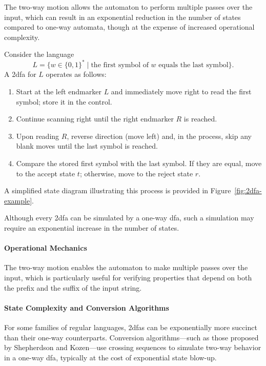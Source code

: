 \begin{remark}
The two-way motion allows the automaton to perform multiple passes over the input, which can result in an exponential reduction in the number of states compared to one-way automata, though at the expense of increased operational complexity.
\end{remark}

\begin{example}
Consider the language 
\[
L = \{ w\in \{0,1\}^* \mid \text{the first symbol of } w \text{ equals the last symbol} \}.
\]
A \gls{2dfa} for \(L\) operates as follows:
\begin{enumerate}
  \item Start at the left endmarker \(L\) and immediately move right to read the first symbol; store it in the control.
  \item Continue scanning right until the right endmarker \(R\) is reached.
  \item Upon reading \(R\), reverse direction (move left) and, in the process, skip any blank moves until the last symbol is reached.
  \item Compare the stored first symbol with the last symbol. If they are equal, move to the accept state \(t\); otherwise, move to the reject state \(r\).
\end{enumerate}
A simplified state diagram illustrating this process is provided in Figure~\ref{fig:2dfa-example}.
\end{example}

\begin{observation}
Although every \gls{2dfa} can be simulated by a one-way \gls{dfa}, such a simulation may require an exponential increase in the number of states.
\end{observation}

\paragraph{Operational Mechanics}
The two-way motion enables the automaton to make multiple passes over the input, which is particularly useful for verifying properties that depend on both the prefix and the suffix of the input string.

\paragraph{State Complexity and Conversion Algorithms}
For some families of regular languages, \glspl{2dfa} can be exponentially more succinct than their one-way counterparts. Conversion algorithms—such as those proposed by Shepherdson and Kozen—use crossing sequences to simulate two-way behavior in a one-way \gls{dfa}, typically at the cost of exponential state blow-up.

